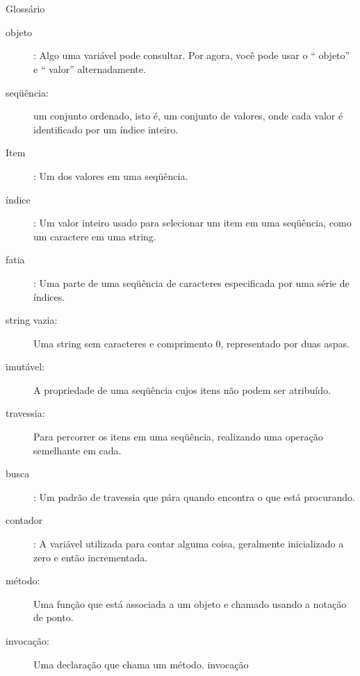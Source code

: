 \documentclass[10pt]{book}
\begin{document}
\section{} Glossário

\begin{description}

\item[objeto]: Algo uma variável pode consultar. Por agora,
você pode usar o `` objeto'' e `` valor'' alternadamente.

\item[seqüência:] um conjunto ordenado, isto é, um conjunto de
valores, onde cada valor é identificado por um índice inteiro.

\item[Item]: Um dos valores em uma seqüência.

\item[índice]: Um valor inteiro usado para selecionar um item em
uma seqüência, como um caractere em uma string.

\item[fatia]: Uma parte de uma seqüência de caracteres especificada por uma série de índices.

\item[string vazia:] Uma string sem caracteres e comprimento 0, representado
por duas aspas.

\item[imutável:] A propriedade de uma seqüência cujos itens não podem
ser atribuído.

\item[travessia:] Para percorrer os itens em uma seqüência,
realizando uma operação semelhante em cada.

\item[busca]: Um padrão de travessia que pára
quando encontra o que está procurando.

\item[contador]: A variável utilizada para contar alguma coisa, geralmente inicializado
a zero e então incrementada.

\item[método:] Uma função que está associada a um objeto e chamado
usando a notação de ponto.

\item[invocação:] Uma declaração que chama um método.
\index{} invocação

\end{description}
\end{document}
